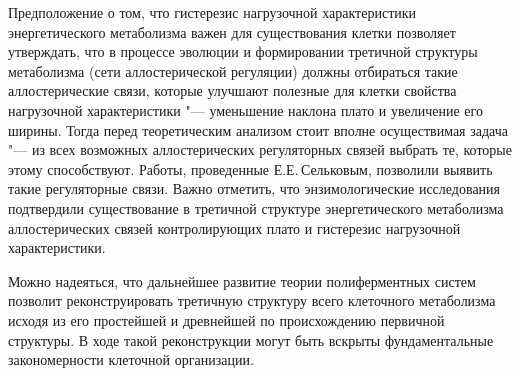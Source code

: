 \documentclass[12pt,a4paper,oneside]{book}
\begin{document}
Предположение о том, что гистерезис нагрузочной характеристики энергетического метаболизма важен для существования клетки позволяет утверждать, что в процессе эволюции и формировании третичной структуры метаболизма (сети аллостерической регуляции) должны отбираться такие аллостерические связи, которые улучшают полезные для клетки свойства нагрузочной характеристики "--- уменьшение наклона плато и увеличение его ширины. Тогда перед теоретическим анализом стоит вполне осуществимая задача "--- из всех возможных аллостерических регуляторных связей выбрать те, которые этому способствуют. Работы, проведенные Е.Е.\,Сельковым, позволили выявить такие регуляторные связи. Важно отметить, что энзимологические исследования подтвердили  существование в третичной структуре энергетического метаболизма аллостерических связей контролирующих плато и гистерезис нагрузочной характеристики. 

Можно надеяться, что дальнейшее развитие теории полиферментных систем позволит реконструировать третичную структуру всего клеточного метаболизма исходя из его простейшей и древнейшей по происхождению  первичной структуры. В ходе такой реконструкции могут быть вскрыты фундаментальные закономерности клеточной организации. 



\newpage
\renewcommand{\bibname}{Список литературы}


\end{document}

